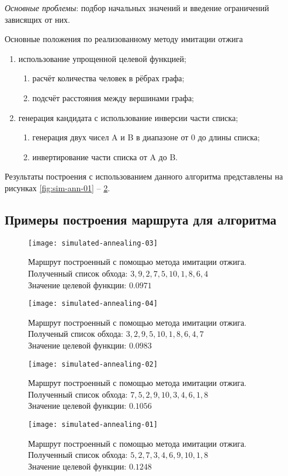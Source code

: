 \emph{Основные проблемы}: подбор начальных значений и введение ограничений зависящих от них.

Основные положения по реализованному методу имитации отжига
\begin{enumerate}
    \item использование упрощенной целевой функцией;
    \begin{enumerate}
        \item расчёт количества человек в рёбрах графа;
        \item подсчёт расстояния между вершинами графа;
    \end{enumerate}
    \item генерация кандидата с использование инверсии части списка;
    \begin{enumerate}
        \item генерация двух чисел A и B в диапазоне от 0 до длины списка;
        \item инвертирование части списка от A до B.
    \end{enumerate}
\end{enumerate}

Результаты построения с использованием данного алгоритма представлены на рисунках 
\ref{fig:sim-ann-01} -- \ref{fig:sim-ann-04}.

\newpage
\subsection{Примеры построения маршрута для алгоритма}
\begin{figure}[ht!]
    \centering
    \texttt{[image: simulated-annealing-03]}
    \caption{Маршрут построенный с помощью метода имитации отжига.\\
        Полученный список обхода: \( 3, 9, 2, 7, 5, 10, 1, 8, 6, 4 \)\\
        Значение целевой функции: \( 0.0971 \)}
    \label{fig:sim-ann-01}
    \texttt{[image: simulated-annealing-04]}
    \caption{Маршрут построенный с помощью метода имитации отжига.\\
        Полученый список обхода: \( 3, 2, 9, 5, 10, 1, 8, 6, 4, 7 \)\\
        Значение целевой функции: \( 0.0983 \)}
    \label{fig:sim-ann-02}
\end{figure}
\begin{figure}[ht!]
    \centering
    \texttt{[image: simulated-annealing-02]}
    \caption{Маршрут построенный с помощью метода имитации отжига.\\
        Полученный список обхода: \( 7, 5, 2, 9, 10, 3, 4, 6, 1, 8 \)\\
        Значение целевой функции: \( 0.1056 \)}
    \label{fig:sim-ann-03}
    \texttt{[image: simulated-annealing-01]}
    \caption{Маршрут построенный с помощью метода имитации отжига.\\
        Полученный список обхода: \( 5, 2, 7, 3, 4, 6, 9, 10, 1, 8 \)\\
        Значение целевой функции: \( 0.1248 \)}
    \label{fig:sim-ann-04}
\end{figure}
\newpage

